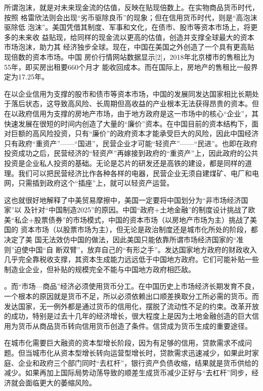 所谓泡沫，就是对未来现金流的估值，反映在贴现倍数上。在实物商品货币时代，按照
格雷欣法则会出现“劣币驱除良币”的现象；但在信用货币时代，则是“高泡沫驱除低
泡沫”。美国凭借其制度、军事和文化，在债市、股市等资本市场上，将更多的未来收
益贴现，给同样的现金流以更高的估值，创造并支撑全球最大的资本市场泡沫，助力其
经济独步全球。现在，中国在美国之外创造了一个具有更高贴现倍数的资本市场。中国
房价行情网站数据显示[2]，2018年北京楼市的售租比为55年，即买房出租要660个月才
能收回成本。而在国际上，房地产的售租比一般界定为17.25年。


在以企业信用为支撑的股市和债市等资本市场，中国的发展同发达国家相比长期处于落后状态，这导致高风险、长周期但高收益的产业根本无法获得昂贵的资本。但在以政府信用为支撑的房地产市场，由于地方政府是这一市场中的核心“企业”，其快速发展在很短的时间内创造了大量的“廉价”资本。在中国目前的资本结构下，面对巨额的高风险投资，只有“廉价”的政府资本才能承受巨大的风险，因此中国经济只有政府“重资产”——“国进”，民营企业才可能“轻资产”——“民进”。也即在政府投资成功之后，民营经济的“轻资产”再嫁接到政府的“重资产”上，因此政府的公共投资是企业私人投资的基础。无论是芯片的研发还是高铁的建设，都是同样的道理。我们可以把民营经济比作各种各样的电器，民营企业无须自建煤矿、电厂和电网，只需插到政府这个“插座”上，就可以轻资产运营。

这也就很好地解释了中美贸易摩擦中，美国一定要将中国划分为“非市场经济国家”以
及针对“中国制造2025”的原因。中国“政府+土地金融”的制度设计挑战了欧
美“私企+股票债券”的市场模式，中国的资本市场（以房地产市场为主）挑战了美国的
资本市场（以股票市场为主），但无论是政治制度还是城市化所处的阶段，都决定了美
国无法效仿中国的做法，因此美国只能依靠所谓市场经济国家的“准则”迫使中国“自
断双臂”，放弃自己的“有形之手”。发达国家地方政府的财政收入几乎完全靠税收支撑，其资本生成能力远远低于中国地方政府。它们可能补贴一些制造业企业，但补贴的规模完全不能与中国地方政府相匹敌。

。而“市场—商品”经济必须使用货币分工。在中国历史上市场经济长期发育不良，一个根本的原因就是货币不足，所以必须依赖出口顺差换取分工所必需的货币。而发达国家，无一例外都是通过货币的信用化，摆脱了流动性不足的约束。改革开放的成功，特别是过去十几年的经济增长，很大程度上是因为土地金融创造的巨大信用为货币从商品货币转向信用货币创造了条件。信贷成为货币生成的重要途径。



在城市化需要巨大融资的资本型增长阶段，因为有足够的信用，贷款需求不成问题。但当城市化从资本型增长转向运营型增长时，贷款需求迅速减少，如果此时家庭、企业和政府三个部门同时“去杠杆”，银行资产负债收缩，结果就是货币供给的减少。如果再加上国际局势动荡导致的顺差生成货币减少正好与“去杠杆”同步，经济就会面临更大的萎缩风险。

